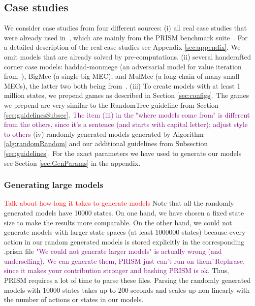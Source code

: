 \subsection{Case studies}
We consider case studies from four different sources: 
(i) all real case studies that were already used in~\cite{gandalf}, which are mainly from the PRISM benchmark suite~\cite{PRISMben}.
For a detailed description of the real case studies see Appendix \ref{sec:appendix}.
We omit models that are already solved by pre-computations.
(ii) several handcrafted corner case models: haddad-monmege (an adversarial model for value iteration from~\cite{haddadmonmege}), BigMec (a single big MEC), and MulMec (a long chain of many small MECs), the latter two both being from~\cite{gandalf}.
(iii) To create models with at least 1 million states, we prepend games as described in Section \ref{sec:configs}.
The games we prepend are very similar to the RandomTree guideline from Section \ref{sec:guidelinesSubsec}.
\textcolor{purple}{The item (iii) in the "where models come from" is different from the others, since it's a sentence (and starts with capital letter); adjust style to others}
(iv) randomly generated models generated by Algorithm \ref{alg:randomRandom} and our additional guidelines from Subsection \ref{sec:guidelines}.
For  the exact parameters we have used to generate our models see Section \ref{sec:GenParams} in the appendix.

\subsubsection*{Generating large models} \label{subsec:largeModels}
\textcolor{red}{Talk about how long it takes to generate models}
Note that all the randomly generated models have 10000 states. On one hand, we have chosen a fixed state size to make the results more comparable.
On the other hand, we could not generate models with larger state spaces (at least 1000000 states) because every action in our random generated models is stored explicitly
in the corresponding .prism file \textcolor{purple}{"We could not generate larger models" is actually wrong (and underselling). We can generate them, PRISM just can't run on them^^ Rephrase, since it makes your contribution stronger and bashing PRISM is ok}. Thus, PRISM requires a lot of time to parse these files. Parsing the randomly generated models with 10000 states takes
up to 200 seconds and scales up non-linearly with the number of actions or states in our models.

